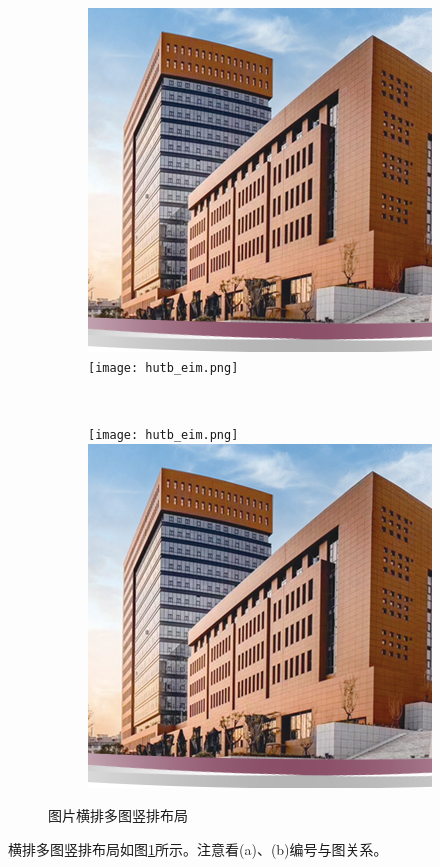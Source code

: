 \begin{figure}[!htb]
    \centering
    \begin{subfigure}[t]{0.3\linewidth}
        \captionsetup{justification=centering} 
        \begin{minipage}[b]{1\linewidth}
        \includegraphics[width=0.45\linewidth]{hutb_building.png}
        \texttt{[image: hutb\_eim.png]}
        \caption{}
        \end{minipage}
    \end{subfigure}\\
    \begin{subfigure}[t]{0.3\linewidth}
        \captionsetup{justification=centering} 
        \begin{minipage}[b]{1\linewidth}
        \texttt{[image: hutb\_eim.png]}
        \includegraphics[width=0.45\linewidth]{hutb_building.png}
        \caption{}
        \end{minipage}
    \end{subfigure}
    \caption{图片横排多图竖排布局}
    \label{f.csu_row_col}
\end{figure}

横排多图竖排布局如图\ref{f.csu_row_col}所示。注意看(a)、(b)编号与图关系。

\newpage
